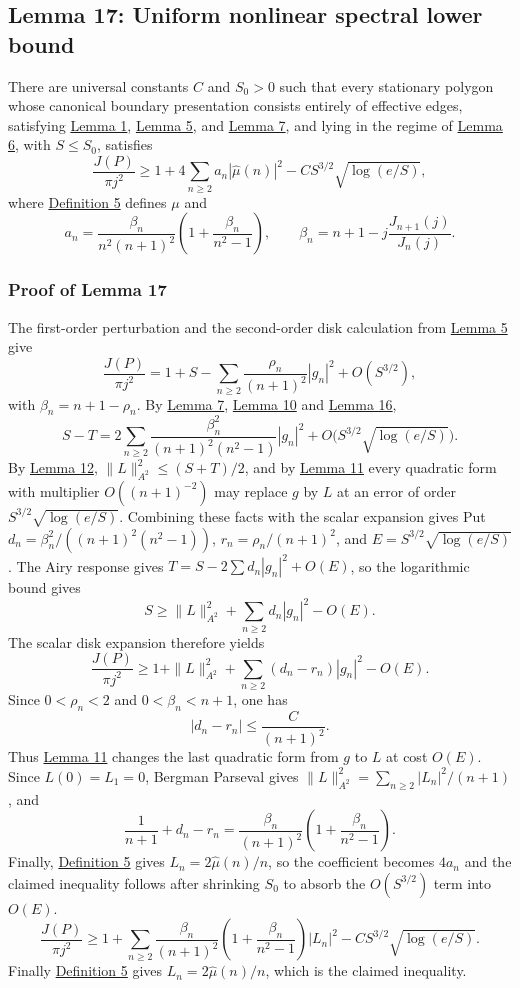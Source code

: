 \documentclass[11pt]{article}
\begin{document}
\subsection{Lemma 17: Uniform nonlinear spectral lower
bound}\label{lem-spectral-core}

There are universal constants \(C\) and \(S_0>0\) such that every
stationary polygon whose canonical boundary presentation consists
entirely of effective edges, satisfying
\hyperref[lem-edge-moments]{Lemma 1},
\hyperref[lem-disk-perturbation]{Lemma 5}, and
\hyperref[lem-gradient-perturbation]{Lemma 7}, and lying in the regime
of \hyperref[lem-near-circle-conformal]{Lemma 6}, with \(S\le S_0\),
satisfies \[
\frac{J(P)}{\pi j^2}\ge 1+4\sum_{n\ge2}a_n|\widehat\mu(n)|^2-C S^{3/2}\sqrt{\log(e/S)},
\] where \hyperref[def-turn-measure]{Definition 5} defines \(\mu\) and
\[
a_n=\frac{\beta_n}{n^2(n+1)^2}\left(1+\frac{\beta_n}{n^2-1}\right),
\qquad \beta_n=n+1-j\frac{J_{n+1}(j)}{J_n(j)}.
\]

\subsubsection{Proof of Lemma 17}\label{proof-lem-spectral-core}

The first-order perturbation and the second-order disk calculation from
\hyperref[lem-disk-perturbation]{Lemma 5} give \[
\frac{J(P)}{\pi j^2}=1+S-\sum_{n\ge2}\frac{\rho_n}{(n+1)^2}|g_n|^2+O(S^{3/2}),
\] with \(\beta_n=n+1-\rho_n\). By
\hyperref[lem-gradient-perturbation]{Lemma 7},
\hyperref[lem-inverse-energy]{Lemma 10} and
\hyperref[lem-airy-quadratic-response]{Lemma 16}, \[
S-T=2\sum_{n\ge2}\frac{\beta_n^2}{(n+1)^2(n^2-1)}|g_n|^2+O\bigl(S^{3/2}\sqrt{\log(e/S)}\bigr).
\] By \hyperref[lem-log-energy-bound]{Lemma 12},
\(\|L\|_{A^2}^2\le(S+T)/2\), and by
\hyperref[lem-frequency-replacement]{Lemma 11} every quadratic form with
multiplier \(O((n+1)^{-2})\) may replace \(g\) by \(L\) at an error of
order \(S^{3/2}\sqrt{\log(e/S)}\). Combining these facts with the scalar
expansion gives Put \(d_n=\beta_n^2/((n+1)^2(n^2-1))\),
\(r_n=\rho_n/(n+1)^2\), and \(E=S^{3/2}\sqrt{\log(e/S)}\). The Airy
response gives \(T=S-2\sum d_n|g_n|^2+O(E)\), so the logarithmic bound
gives \[
S\ge \|L\|_{A^2}^2+\sum_{n\ge2}d_n|g_n|^2-O(E).
\] The scalar disk expansion therefore yields \[
\frac{J(P)}{\pi j^2}
\ge1+\|L\|_{A^2}^2+\sum_{n\ge2}(d_n-r_n)|g_n|^2-O(E).
\] Since \(0<\rho_n<2\) and \(0<\beta_n<n+1\), one has \[
|d_n-r_n|\le\frac{C}{(n+1)^2}.
\] Thus \hyperref[lem-frequency-replacement]{Lemma 11} changes the last
quadratic form from \(g\) to \(L\) at cost \(O(E)\). Since
\(L(0)=L_1=0\), Bergman Parseval gives
\(\|L\|_{A^2}^2=\sum_{n\ge2}|L_n|^2/(n+1)\), and \[
\frac1{n+1}+d_n-r_n
=\frac{\beta_n}{(n+1)^2}\left(1+\frac{\beta_n}{n^2-1}\right).
\] Finally, \hyperref[def-turn-measure]{Definition 5} gives
\(L_n=2\widehat\mu(n)/n\), so the coefficient becomes \(4a_n\) and the
claimed inequality follows after shrinking \(S_0\) to absorb the
\(O(S^{3/2})\) term into \(O(E)\). \[
\frac{J(P)}{\pi j^2}\ge1+\sum_{n\ge2}\frac{\beta_n}{(n+1)^2}\left(1+\frac{\beta_n}{n^2-1}\right)|L_n|^2-C S^{3/2}\sqrt{\log(e/S)}.
\] Finally \hyperref[def-turn-measure]{Definition 5} gives
\(L_n=2\widehat\mu(n)/n\), which is the claimed inequality.
\end{document}

